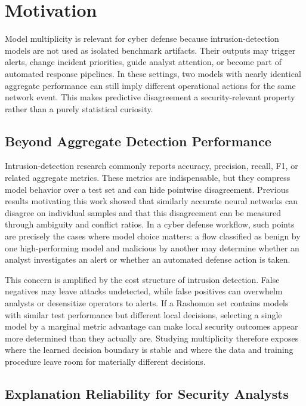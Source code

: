 \section{Motivation}

Model multiplicity is relevant for cyber defense because intrusion-detection models are not used as isolated benchmark artifacts. Their outputs may trigger alerts, change incident priorities, guide analyst attention, or become part of automated response pipelines. In these settings, two models with nearly identical aggregate performance can still imply different operational actions for the same network event. This makes predictive disagreement a security-relevant property rather than a purely statistical curiosity.

\subsection{Beyond Aggregate Detection Performance}

Intrusion-detection research commonly reports accuracy, precision, recall, \gls{F1}, or related aggregate metrics. These metrics are indispensable, but they compress model behavior over a test set and can hide pointwise disagreement. Previous results motivating this work showed that similarly accurate neural networks can disagree on individual samples and that this disagreement can be measured through ambiguity and conflict ratios. In a cyber defense workflow, such points are precisely the cases where model choice matters: a flow classified as benign by one high-performing model and malicious by another may determine whether an analyst investigates an alert or whether an automated defense action is taken.

This concern is amplified by the cost structure of intrusion detection. False negatives may leave attacks undetected, while false positives can overwhelm analysts or desensitize operators to alerts. If a Rashomon set contains models with similar test performance but different local decisions, selecting a single model by a marginal metric advantage can make local security outcomes appear more determined than they actually are. Studying multiplicity therefore exposes where the learned decision boundary is stable and where the data and training procedure leave room for materially different decisions.

\subsection{Explanation Reliability for Security Analysts}

